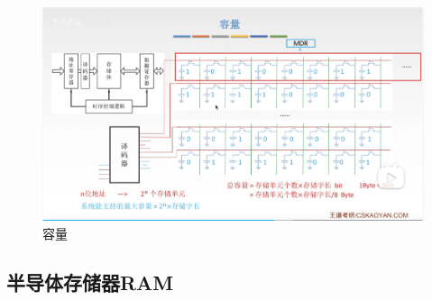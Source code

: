 \documentclass[12pt]{ctexart}
\begin{document}
\begin{figure}[htbp]
    \centering
    \includegraphics[scale=0.6]{容量.png}
    \caption{容量}
    \end{figure}
\subsection{半导体存储器RAM}
\end{document}
